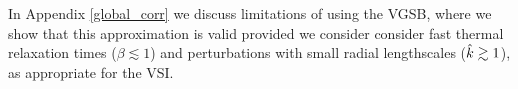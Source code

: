  In Appendix \ref{global_corr}  we discuss limitations of using
  the VGSB, where we show that this approximation is valid provided we 
  consider consider fast thermal relaxation times
  ($\beta\lesssim 1$) and perturbations with small radial lengthscales
  ($\hat{k}\gtrsim 1$), as appropriate for the VSI.  












  





